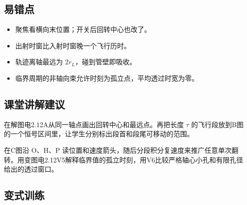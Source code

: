 \documentclass[UTF8,fontset=fandol,a4paper,11pt]{ctexart}
\begin{document}


\subsection*{易错点}

\begin{itemize}
\item 聚焦看横向末位置；开关后回转中心也改了。
\item 出射时窗比入射时窗晚一个飞行历时。
\item 轨迹离轴最远为 $2r_L$，碰到管壁即吸收。
\item 临界周期的非轴向束允许时刻为孤立点，平均透过时宽为零。
\end{itemize}



\subsection*{课堂讲解建议}

在解图电2.12A从同一轴点画出回转中心和最远点。再把长度 $\tau$ 的飞行段放到B图的一个恒号区间里，让学生分别标出段首和段尾可移动的范围。

在C图沿 O、H、P 读位置和速度箭头，随后分段积分复速度来推广任意单次翻转。用变图电2.12V5解释临界值的孤立时刻，用V6比较严格轴心小孔和有限孔径给出的透过窗口。


\subsection*{变式训练}
\end{document}
